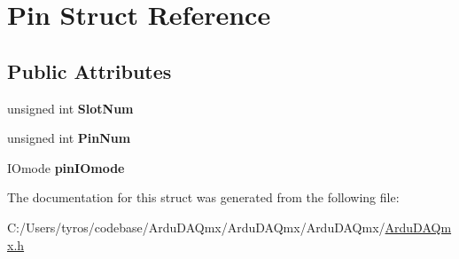 \hypertarget{struct_pin}{}\section{Pin Struct Reference}
\label{struct_pin}
\subsection*{Public Attributes}
\begin{DoxyCompactItemize}
\item 
\mbox{\label{struct_pin_ad5ea72ca564c7952da5844dea50fd5ab}} 
unsigned int {\bfseries Slot\+Num}
\item 
\mbox{\label{struct_pin_a83996990e653eeb6c659684cfac21965}} 
unsigned int {\bfseries Pin\+Num}
\item 
\mbox{\label{struct_pin_acf289cf5ea619f89449e32de8647eec2}} 
I\+Omode {\bfseries pin\+I\+Omode}
\end{DoxyCompactItemize}


The documentation for this struct was generated from the following file\+:\begin{DoxyCompactItemize}
\item 
C\+:/\+Users/tyros/codebase/\+Ardu\+D\+A\+Qmx/\+Ardu\+D\+A\+Qmx/\+Ardu\+D\+A\+Qmx/\mbox{\hyperlink{_ardu_d_a_qmx_8h}{Ardu\+D\+A\+Qmx.\+h}}\end{DoxyCompactItemize}
